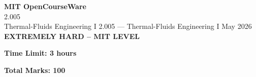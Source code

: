 \documentclass[12pt,a4paper]{exam}
\begin{document}
\begin{center}
{\LARGE \textbf{MIT OpenCourseWare}}\\2.005\\Thermal-Fluids Engineering I
\vspace{0.5cm}
{2.005} --- {Thermal-Fluids Engineering I}
\vspace{0.3cm}
May 2026
\vspace{0.3cm}
\textbf{EXTREMELY HARD -- MIT LEVEL}
\end{center}

\begin{center}
\textbf{Time Limit: 3 hours}
\end{center}

\begin{center}
\textbf{Total Marks: 100}
\end{center}

\vspace{0.5cm}
\end{document}
